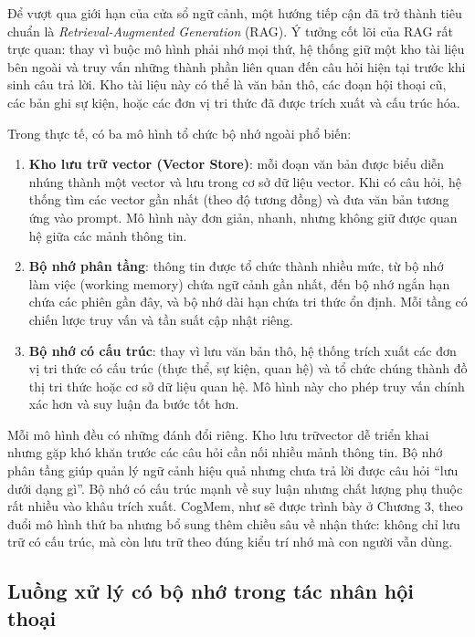 \documentclass[../main.tex]{subfiles}
\begin{document}
Để vượt qua giới hạn của cửa sổ ngữ cảnh, một hướng tiếp cận đã trở thành tiêu chuẩn là \textit{Retrieval-Augmented Generation} (RAG). Ý tưởng cốt lõi của RAG rất trực quan: thay vì buộc mô hình phải nhớ mọi thứ, hệ thống giữ một kho tài liệu bên ngoài và truy vấn những thành phần liên quan đến câu hỏi hiện tại trước khi sinh câu trả lời. Kho tài liệu này có thể là văn bản thô, các đoạn hội thoại cũ, các bản ghi sự kiện, hoặc các đơn vị tri thức đã được trích xuất và cấu trúc hóa.

Trong thực tế, có ba mô hình tổ chức bộ nhớ ngoài phổ biến:

\begin{enumerate}
    \item \textbf{Kho lưu trữ vector (Vector Store)}: mỗi đoạn văn bản được biểu diễn nhúng thành một vector và lưu trong cơ sở dữ liệu vector. Khi có câu hỏi, hệ thống tìm các vector gần nhất (theo độ tương đồng) và đưa văn bản tương ứng vào prompt. Mô hình này đơn giản, nhanh, nhưng không giữ được quan hệ giữa các mảnh thông tin.
    \item \textbf{Bộ nhớ phân tầng}: thông tin được tổ chức thành nhiều mức, từ bộ nhớ làm việc (working memory) chứa ngữ cảnh gần nhất, đến bộ nhớ ngắn hạn chứa các phiên gần đây, và bộ nhớ dài hạn chứa tri thức ổn định. Mỗi tầng có chiến lược truy vấn và tần suất cập nhật riêng.
    \item \textbf{Bộ nhớ có cấu trúc}: thay vì lưu văn bản thô, hệ thống trích xuất các đơn vị tri thức có cấu trúc (thực thể, sự kiện, quan hệ) và tổ chức chúng thành đồ thị tri thức hoặc cơ sở dữ liệu quan hệ. Mô hình này cho phép truy vấn chính xác hơn và suy luận đa bước tốt hơn.
\end{enumerate}

Mỗi mô hình đều có những đánh đổi riêng. Kho lưu trữvector dễ triển khai nhưng gặp khó khăn trước các câu hỏi cần nối nhiều mảnh thông tin. Bộ nhớ phân tầng giúp quản lý ngữ cảnh hiệu quả nhưng chưa trả lời được câu hỏi ``lưu dưới dạng gì''. Bộ nhớ có cấu trúc mạnh về suy luận nhưng chất lượng phụ thuộc rất nhiều vào khâu trích xuất. CogMem, như sẽ được trình bày ở Chương 3, theo đuổi mô hình thứ ba nhưng bổ sung thêm chiều sâu về nhận thức: không chỉ lưu trữ có cấu trúc, mà còn lưu trữ theo đúng kiểu trí nhớ mà con người vẫn dùng.

\subsection{Luồng xử lý có bộ nhớ trong tác nhân hội thoại}
\end{document}
